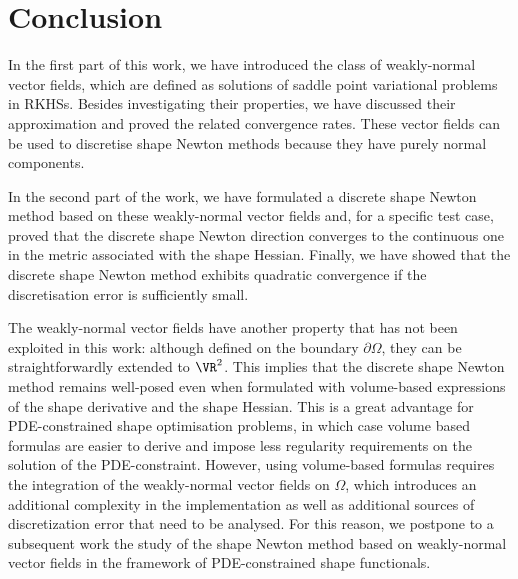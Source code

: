 \documentclass{siamart1116}
\numberwithin{theorem}{section}
\begin{document}
\section{Conclusion}
In the first part of this work, we have introduced the class of
weakly-normal vector fields, which are defined as solutions of saddle point
variational problems in RKHSs.
Besides investigating their properties, we have discussed their
approximation and proved the related convergence rates.
These vector fields can be used to discretise
shape Newton methods because they have purely normal components.

In the second part of the work, we have formulated a discrete shape Newton
method based on these weakly-normal vector fields and, for a specific test
case, proved that the discrete shape Newton direction converges to the
continuous one in the metric associated with the shape Hessian.
Finally, we have showed that the discrete shape Newton method
exhibits quadratic convergence if the discretisation error
is sufficiently small.

The weakly-normal vector fields have another property that has not
been exploited in this work: although defined on the boundary
$\partial \Omega$, they can be straightforwardly extended to $\VR^2$.
This implies that the discrete shape Newton method remains well-posed
even when formulated with volume-based expressions of the shape
derivative and the shape Hessian. This is a great advantage for
PDE-constrained shape optimisation problems,
in which case volume based formulas are easier to derive and impose
less regularity requirements on the solution of the PDE-constraint.
However, using volume-based formulas requires the integration of
the weakly-normal vector fields on $\Omega$, which introduces an
additional complexity in the implementation as well as additional sources
of discretization error that need to be analysed.
For this reason, we postpone to a subsequent work the study of the shape
Newton method based on weakly-normal vector fields  in the framework of
PDE-constrained shape functionals.
\end{document}
